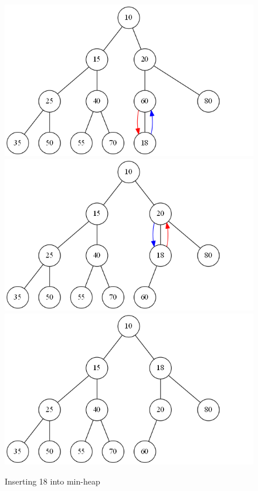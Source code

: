 \documentclass[11pt,a4paper]{amsart}
\theoremstyle{plain}
\numberwithin{equation}{section}
\begin{document}
\begin{figure}[h] \label{fig:png}
\centering
\includegraphics[scale=0.3]{insert1}
\includegraphics[scale=0.3]{insert2}
\includegraphics[scale=0.3]{insert3}
\caption{Inserting 18 into min-heap}
\end{figure}
\end{document}
